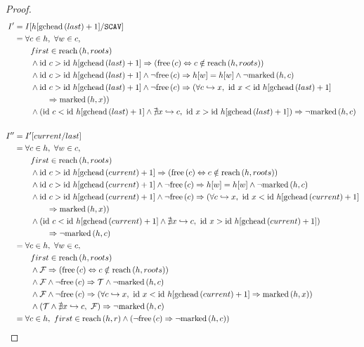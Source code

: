 \begin{proof}
  \begin{align*}
    I' &= I[h[\gchead{last} + 1] / \mathtt{SCAV}]\\
    &=\forall c \in h,\ \forall w \in c,\\
    &\quad\quad first \in \reach{h}{roots}\\
    &\quad\quad \land \id~c > \id~h[\gchead{last} + 1] \implies
    (\free{c} \iff c \notin \reach{h}{roots})\\
    &\quad\quad \land \id~c > \id~h[\gchead{last} + 1] \land
    \lnot\free{c} \implies h[w] = h[w] \land \lnot \marked{h}{c}\\
    &\quad\quad \land \id~c > \id~h[\gchead{last} + 1] \land
    \lnot\free{c} \implies (\forall c \pointsto x,\ \id~x <
    \id~h[\gchead{last} + 1]\\&\quad\quad\quad\quad\implies \marked{h}{x})\\
    &\quad\quad \land \left(\id~c < \id~h[\gchead{last} + 1] \land
    \nexists x \pointsto c,\ \id~x > \id~h[\gchead{last} + 1]\right)
    \implies \lnot\marked{h}{c}\\\\
%
    I'' &= I'[current / last]\\
    &=\forall c \in h,\ \forall w \in c,\\
    &\quad\quad first \in \reach{h}{roots}\\
    &\quad\quad \land \id~c > \id~h[\gchead{current} + 1] \implies
    (\free{c} \iff c \notin \reach{h}{roots})\\
    &\quad\quad \land \id~c > \id~h[\gchead{current} + 1] \land
    \lnot\free{c} \implies h[w] = h[w] \land \lnot \marked{h}{c}\\
    &\quad\quad \land \id~c > \id~h[\gchead{current} + 1] \land
    \lnot\free{c} \implies (\forall c \pointsto x,\ \id~x <
    \id~h[\gchead{current} + 1]\\&\quad\quad\quad\quad\implies \marked{h}{x})\\
    &\quad\quad \land \left(\id~c < \id~h[\gchead{current} + 1] \land
    \nexists x \pointsto c,\ \id~x > \id~h[\gchead{current} + 1]\right)
    \\&\quad\quad\quad\quad\implies \lnot\marked{h}{c}\\
%
    &=\forall c \in h,\ \forall w \in c,\\
    &\quad\quad first \in \reach{h}{roots}\\
    &\quad\quad \land \lfalse \implies (\free{c} \iff c \notin
    \reach{h}{roots})\\
    &\quad\quad \land \lfalse \land \lnot\free{c} \implies
    \ltrue \land \lnot \marked{h}{c}\\
    &\quad\quad \land \lfalse \land \lnot\free{c} \implies
    (\forall c \pointsto x,\ \id~x < \id~h[\gchead{current} + 1]
    \implies \marked{h}{x})\\
    &\quad\quad \land \left(\ltrue \land \nexists x \pointsto
    c,\ \lfalse\right) \implies \lnot\marked{h}{c}\\
%
    &= \forall c \in h,\ first \in \reach{h}{r} \land (\lnot\free{c}
    \implies \lnot \marked{h}{c})
  \end{align*}


\end{proof}
